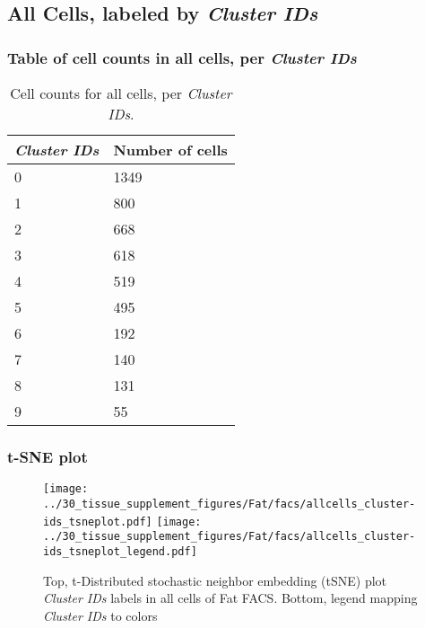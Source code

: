 \clearpage

\subsection{All Cells, labeled by \emph{Cluster IDs}}
\subsubsection{Table of cell counts in all cells, per \emph{Cluster IDs}}\begin{table}[h]
\centering
\label{my-label}
\begin{tabular}{@{}ll@{}}
\toprule

\emph{Cluster IDs}& Number of cells \\ \midrule
0 & 1349 \\

1 & 800 \\

2 & 668 \\

3 & 618 \\

4 & 519 \\

5 & 495 \\

6 & 192 \\

7 & 140 \\

8 & 131 \\

9 & 55 \\
\bottomrule
\end{tabular}
\caption{Cell counts for all cells, per \emph{Cluster IDs}.}
\end{table}

\clearpage
\subsubsection{t-SNE plot}
\begin{figure}[h]
\centering
\texttt{[image: ../30\_tissue\_supplement\_figures/Fat/facs/allcells\_cluster-ids\_tsneplot.pdf]}
\texttt{[image: ../30\_tissue\_supplement\_figures/Fat/facs/allcells\_cluster-ids\_tsneplot\_legend.pdf]}
\caption{Top, t-Distributed stochastic neighbor embedding (tSNE) plot  \emph{Cluster IDs} labels in all cells of Fat FACS. Bottom, legend mapping \emph{Cluster IDs} to colors}
\end{figure}


